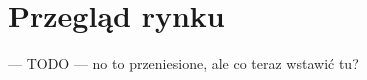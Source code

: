 \chapter{Przegląd rynku}\label{ch:przeglad-rynku}


--- TODO --- no to przeniesione, ale co teraz wstawić tu?
